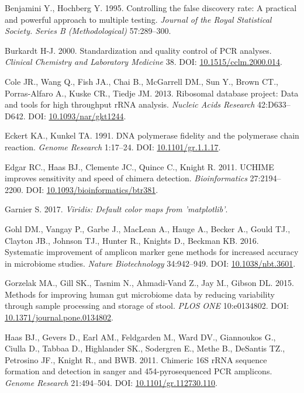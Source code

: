 \documentclass[12pt,]{article}
\begin{document}
\hypertarget{ref-benjamini_controlling_1995}{}
Benjamini Y., Hochberg Y. 1995. Controlling the false discovery rate: A
practical and powerful approach to multiple testing. \emph{Journal of
the Royal Statistical Society. Series B (Methodological)} 57:289--300.

\hypertarget{ref-Burkardt2000}{}
Burkardt H-J. 2000. Standardization and quality control of PCR analyses.
\emph{Clinical Chemistry and Laboratory Medicine} 38. DOI:
\href{https://doi.org/10.1515/cclm.2000.014}{10.1515/cclm.2000.014}.

\hypertarget{ref-rdp_Cole_2013}{}
Cole JR., Wang Q., Fish JA., Chai B., McGarrell DM., Sun Y., Brown CT.,
Porras-Alfaro A., Kuske CR., Tiedje JM. 2013. Ribosomal database
project: Data and tools for high throughput rRNA analysis. \emph{Nucleic
Acids Research} 42:D633--D642. DOI:
\href{https://doi.org/10.1093/nar/gkt1244}{10.1093/nar/gkt1244}.

\hypertarget{ref-Eckert1991}{}
Eckert KA., Kunkel TA. 1991. DNA polymerase fidelity and the polymerase
chain reaction. \emph{Genome Research} 1:17--24. DOI:
\href{https://doi.org/10.1101/gr.1.1.17}{10.1101/gr.1.1.17}.

\hypertarget{ref-uchime_Edgar_2011}{}
Edgar RC., Haas BJ., Clemente JC., Quince C., Knight R. 2011. UCHIME
improves sensitivity and speed of chimera detection.
\emph{Bioinformatics} 27:2194--2200. DOI:
\href{https://doi.org/10.1093/bioinformatics/btr381}{10.1093/bioinformatics/btr381}.

\hypertarget{ref-viridis_citation_2017}{}
Garnier S. 2017. \emph{Viridis: Default color maps from 'matplotlib'}.

\hypertarget{ref-taq_Gohl_2016}{}
Gohl DM., Vangay P., Garbe J., MacLean A., Hauge A., Becker A., Gould
TJ., Clayton JB., Johnson TJ., Hunter R., Knights D., Beckman KB. 2016.
Systematic improvement of amplicon marker gene methods for increased
accuracy in microbiome studies. \emph{Nature Biotechnology} 34:942--949.
DOI: \href{https://doi.org/10.1038/nbt.3601}{10.1038/nbt.3601}.

\hypertarget{ref-Gorzelak2015}{}
Gorzelak MA., Gill SK., Tasnim N., Ahmadi-Vand Z., Jay M., Gibson DL.
2015. Methods for improving human gut microbiome data by reducing
variability through sample processing and storage of stool. \emph{PLOS
ONE} 10:e0134802. DOI:
\href{https://doi.org/10.1371/journal.pone.0134802}{10.1371/journal.pone.0134802}.

\hypertarget{ref-Haas2011}{}
Haas BJ., Gevers D., Earl AM., Feldgarden M., Ward DV., Giannoukos G.,
Ciulla D., Tabbaa D., Highlander SK., Sodergren E., Methe B., DeSantis
TZ., Petrosino JF., Knight R., and BWB. 2011. Chimeric 16S rRNA sequence
formation and detection in sanger and 454-pyrosequenced PCR amplicons.
\emph{Genome Research} 21:494--504. DOI:
\href{https://doi.org/10.1101/gr.112730.110}{10.1101/gr.112730.110}.
\end{document}
